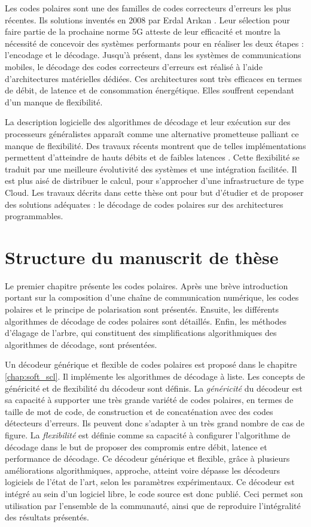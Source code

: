 Les codes polaires sont une des familles de codes correcteurs d'erreurs les plus récentes. Ils solutions inventés en 2008 par Erdal Ar{\i}kan \cite{arikan_channel_2009}. Leur sélection pour faire partie de la prochaine norme 5G atteste de leur efficacité et montre la nécessité de concevoir des systèmes performants pour en réaliser les deux étapes : l'encodage et le décodage. Jusqu'à présent, dans les systèmes de communications mobiles, le décodage des codes correcteurs d'erreurs est réalisé à l'aide d'architectures matérielles dédiées. Ces architectures sont très efficaces en termes de débit, de latence et de consommation énergétique. Elles souffrent cependant d'un manque de flexibilité.


La description logicielle des algorithmes de décodage et leur exécution sur des processeurs généralistes apparaît comme une alternative prometteuse palliant ce manque de flexibilité. Des travaux récents montrent que de telles implémentations permettent d'atteindre de hauts débits et de faibles latences \cite{sarkis_fast_2014,giard_fast_2014}. Cette flexibilité se traduit par une meilleure évolutivité des systèmes et une intégration facilitée. Il est plus aisé de distribuer le calcul, pour s'approcher d'une infrastructure de type Cloud. Les travaux décrits dans cette thèse ont pour but d'étudier et de proposer des solutions adéquates : le décodage de codes polaires sur des architectures programmables.

\section*{Structure du manuscrit de thèse}

Le premier chapitre présente les codes polaires. Après une brève introduction portant sur la composition d'une chaîne de communication numérique, les codes polaires et le principe de polarisation sont présentés. Ensuite, les différents algorithmes de décodage de codes polaires sont détaillés. Enfin, les méthodes d'élagage de l'arbre, qui constituent des simplifications algorithmiques des algorithmes de décodage, sont présentées.

Un décodeur générique et flexible de codes polaires est proposé dans le chapitre \ref{chap:soft_scl}. Il implémente les algorithmes de décodage à liste. Les concepts de généricité et de flexibilité du décodeur sont définis. La \textit{généricité} du décodeur est sa capacité à supporter une très grande variété de codes polaires, en termes de taille de mot de code, de construction et de concaténation avec des codes détecteurs d'erreurs. Ils peuvent donc s'adapter à un très grand nombre de cas de figure. La \textit{flexibilité} est définie comme sa capacité à configurer l'algorithme de décodage dans le but de proposer des compromis entre débit, latence et performance de décodage. Ce décodeur générique et flexible, grâce à plusieurs améliorations algorithmiques, approche, atteint voire dépasse les décodeurs logiciels de l'état de l'art, selon les paramètres expérimentaux. Ce décodeur est intégré au sein d'un logiciel libre, le code source est donc publié. Ceci permet son utilisation par l'ensemble de la communauté, ainsi que de reproduire l'intégralité des résultats présentés.

